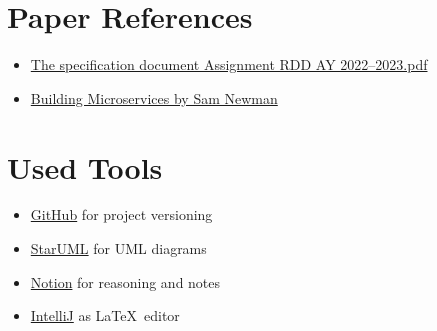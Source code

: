 \section{Paper References}
\label{sec:paper_references}%
\begin{itemize}
    \item \href{https://polimi365-my.sharepoint.com/:b:/g/personal/10685242_polimi_it/EWPABzzjfF9EsgYvSiuvdAIBAz6qnjdfLuPE8kwQSxeyCg?e=6qasKD}{The specification document Assignment RDD AY 2022--2023.pdf}
    \item \href{https://www.oreilly.com/library/view/building-microservices/9781491950340/}{Building Microservices by Sam Newman}
\end{itemize}


\section{Used Tools}
\label{sec:used_tools}%
\begin{itemize}
    \item \href{https://github.com/}{GitHub} for project versioning
    \item \href{https://staruml.io/}{StarUML} for UML diagrams
    \item \href{https://www.notion.so/}{Notion} for reasoning and notes
    \item \href{https://www.jetbrains.com/idea/}{IntelliJ} as \LaTeX\ editor
\end{itemize}
